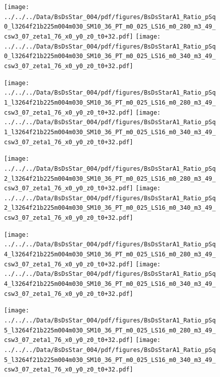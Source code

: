 \documentclass[a4paper,10pt]{article}
\begin{document}
\begin{figure}[p]
 \texttt{[image: ../../../Data/BsDsStar\_004/pdf/figures/BsDsStarA1\_Ratio\_pSq0\_l3264f21b225m004m030\_SM10\_36\_PT\_m0\_025\_LS16\_m0\_280\_m3\_49\_csw3\_07\_zeta1\_76\_x0\_y0\_z0\_t0+32.pdf]} 
 \texttt{[image: ../../../Data/BsDsStar\_004/pdf/figures/BsDsStarA1\_Ratio\_pSq0\_l3264f21b225m004m030\_SM10\_36\_PT\_m0\_025\_LS16\_m0\_340\_m3\_49\_csw3\_07\_zeta1\_76\_x0\_y0\_z0\_t0+32.pdf]} 
 \end{figure}
\begin{figure}[p]
 \texttt{[image: ../../../Data/BsDsStar\_004/pdf/figures/BsDsStarA1\_Ratio\_pSq1\_l3264f21b225m004m030\_SM10\_36\_PT\_m0\_025\_LS16\_m0\_280\_m3\_49\_csw3\_07\_zeta1\_76\_x0\_y0\_z0\_t0+32.pdf]} 
 \texttt{[image: ../../../Data/BsDsStar\_004/pdf/figures/BsDsStarA1\_Ratio\_pSq1\_l3264f21b225m004m030\_SM10\_36\_PT\_m0\_025\_LS16\_m0\_340\_m3\_49\_csw3\_07\_zeta1\_76\_x0\_y0\_z0\_t0+32.pdf]} 
 \end{figure}
\begin{figure}[p]
 \texttt{[image: ../../../Data/BsDsStar\_004/pdf/figures/BsDsStarA1\_Ratio\_pSq2\_l3264f21b225m004m030\_SM10\_36\_PT\_m0\_025\_LS16\_m0\_280\_m3\_49\_csw3\_07\_zeta1\_76\_x0\_y0\_z0\_t0+32.pdf]} 
 \texttt{[image: ../../../Data/BsDsStar\_004/pdf/figures/BsDsStarA1\_Ratio\_pSq2\_l3264f21b225m004m030\_SM10\_36\_PT\_m0\_025\_LS16\_m0\_340\_m3\_49\_csw3\_07\_zeta1\_76\_x0\_y0\_z0\_t0+32.pdf]} 
 \end{figure}
\clearpage
\begin{figure}[p]
 \texttt{[image: ../../../Data/BsDsStar\_004/pdf/figures/BsDsStarA1\_Ratio\_pSq4\_l3264f21b225m004m030\_SM10\_36\_PT\_m0\_025\_LS16\_m0\_280\_m3\_49\_csw3\_07\_zeta1\_76\_x0\_y0\_z0\_t0+32.pdf]} 
 \texttt{[image: ../../../Data/BsDsStar\_004/pdf/figures/BsDsStarA1\_Ratio\_pSq4\_l3264f21b225m004m030\_SM10\_36\_PT\_m0\_025\_LS16\_m0\_340\_m3\_49\_csw3\_07\_zeta1\_76\_x0\_y0\_z0\_t0+32.pdf]} 
 \end{figure}
\begin{figure}[p]
 \texttt{[image: ../../../Data/BsDsStar\_004/pdf/figures/BsDsStarA1\_Ratio\_pSq5\_l3264f21b225m004m030\_SM10\_36\_PT\_m0\_025\_LS16\_m0\_280\_m3\_49\_csw3\_07\_zeta1\_76\_x0\_y0\_z0\_t0+32.pdf]} 
 \texttt{[image: ../../../Data/BsDsStar\_004/pdf/figures/BsDsStarA1\_Ratio\_pSq5\_l3264f21b225m004m030\_SM10\_36\_PT\_m0\_025\_LS16\_m0\_340\_m3\_49\_csw3\_07\_zeta1\_76\_x0\_y0\_z0\_t0+32.pdf]} 
 \end{figure}
\clearpage
\end{document}
